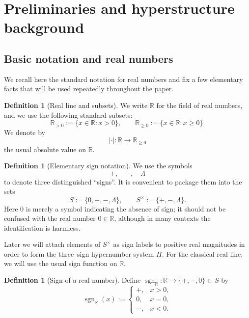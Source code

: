\documentclass[11pt]{amsart}
\numberwithin{equation}{section}
\theoremstyle{definition}
\newtheorem{definition}[theorem]{Definition}
\theoremstyle{remark}
\newcommand{\R}{\mathbb{R}}
\newcommand{\Rp}{\mathbb{R}_{>0}}
\newcommand{\Hnum}{H}                      %
\newcommand{\Sset}{S}                      %
\newcommand{\Snon}{S^{\times}}             %
\begin{document}
\section{Preliminaries and hyperstructure background}
\label{sec:prelim}

\subsection{Basic notation and real numbers}

We recall here the standard notation for real numbers and fix a few
elementary facts that will be used repeatedly throughout the paper.

\begin{definition}[Real line and subsets]\label{def:basic-R}
We write $\R$ for the field of real numbers, and we use the following
standard subsets:
\[
  \Rp := \{x\in\R : x>0\},\qquad
  \R_{\ge0} := \{x\in\R : x\ge0\}.
\]
We denote by
\[
  |\cdot|:\R\longrightarrow\R_{\ge0}
\]
the usual absolute value on $\R$.
\end{definition}

\begin{definition}[Elementary sign notation]\label{def:basic-signs}
We use the symbols
\[
  +,\quad -,\quad \Lambda
\]
to denote three distinguished ``signs''.  It is convenient to package
them into the sets
\[
  \Sset := \{0,+,-,\Lambda\},\qquad
  \Snon := \{+,-,\Lambda\}.
\]
Here $0$ is merely a symbol indicating the absence of sign; it should
not be confused with the real number $0\in\R$, although in many
contexts the identification is harmless.
\end{definition}

Later we will attach elements of $\Snon$ as sign labels to positive
real magnitudes in order to form the three--sign hypernumber system
$\Hnum$.  For the classical real line, we will use the usual sign
function on $\R$.

\begin{definition}[Sign of a real number]\label{def:basic-real-sign}
Define $\operatorname{sgn}_\R:\R\to\{+,-,0\}\subset\Sset$ by
\[
  \operatorname{sgn}_\R(x) :=
  \begin{cases}
    +, & x>0,\\
    0, & x=0,\\
    -, & x<0.
  \end{cases}
\]
\end{definition}
\end{document}

